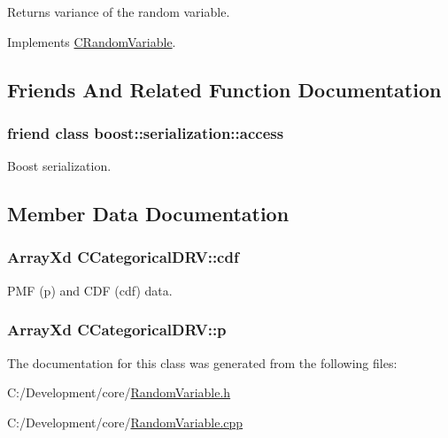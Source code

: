 Returns variance of the random variable. 



Implements \hyperlink{class_c_random_variable_a3b0b87c4aab74c0406cd8321b8b96747}{C\-Random\-Variable}.



\subsection{Friends And Related Function Documentation}
\hypertarget{class_c_categorical_d_r_v_ac98d07dd8f7b70e16ccb9a01abf56b9c}{
\subsubsection[{boost\-::serialization\-::access}]{\setlength{\rightskip}{0pt plus 5cm}friend class boost\-::serialization\-::access\hspace{0.3cm}{\ttfamily [friend]}}}\label{class_c_categorical_d_r_v_ac98d07dd8f7b70e16ccb9a01abf56b9c}


Boost serialization. 



\subsection{Member Data Documentation}
\hypertarget{class_c_categorical_d_r_v_a78c2837dfae368a3ecdbb416b0e9d094}{
\subsubsection[{cdf}]{\setlength{\rightskip}{0pt plus 5cm}Array\-Xd C\-Categorical\-D\-R\-V\-::cdf\hspace{0.3cm}{\ttfamily [private]}}}\label{class_c_categorical_d_r_v_a78c2837dfae368a3ecdbb416b0e9d094}
P\-M\-F (p) and C\-D\-F (cdf) data. \hypertarget{class_c_categorical_d_r_v_ae7de998dd49975a1be0de37cbc4f23b5}{
\subsubsection[{p}]{\setlength{\rightskip}{0pt plus 5cm}Array\-Xd C\-Categorical\-D\-R\-V\-::p\hspace{0.3cm}{\ttfamily [private]}}}\label{class_c_categorical_d_r_v_ae7de998dd49975a1be0de37cbc4f23b5}


The documentation for this class was generated from the following files\-:\begin{DoxyCompactItemize}
\item 
C\-:/\-Development/core/\hyperlink{_random_variable_8h}{Random\-Variable.\-h}\item 
C\-:/\-Development/core/\hyperlink{_random_variable_8cpp}{Random\-Variable.\-cpp}\end{DoxyCompactItemize}
